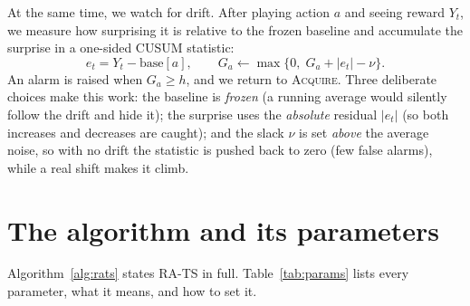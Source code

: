 \documentclass[11pt]{article}
\newcommand{\ACQ}{\textsc{Acquire}\xspace}
\begin{document}
At the same time, we watch for drift. After playing action $a$ and seeing reward $Y_t$, we measure
how surprising it is relative to the frozen baseline and accumulate the surprise in a one-sided
CUSUM statistic:
\begin{equation}
    e_t = Y_t - \mathrm{base}[a],
    \qquad
    G_a \leftarrow \max\{0,\; G_a + |e_t| - \nu\}.
    \label{eq:cusum}
\end{equation}
An alarm is raised when $G_a \ge h$, and we return to \ACQ. Three deliberate choices make this
work: the baseline is \emph{frozen} (a running average would silently follow the drift and hide
it); the surprise uses the \emph{absolute} residual $|e_t|$ (so both increases and decreases are
caught); and the slack $\nu$ is set \emph{above} the average noise, so with no drift the statistic
is pushed back to zero (few false alarms), while a real shift makes it climb.

\section{The algorithm and its parameters}
\label{sec:alg}

Algorithm~\ref{alg:rats} states RA-TS in full. Table~\ref{tab:params} lists every parameter, what
it means, and how to set it.
\end{document}
